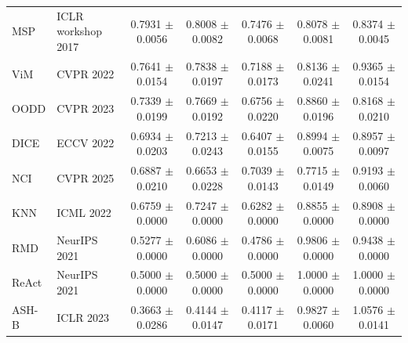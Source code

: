 \begin{table}[!htbp]
{\begin{tabular}{llccccc}
MSP & ICLR workshop 2017 & 0.7931 $\pm$ 0.0056 & 0.8008 $\pm$ 0.0082 & 0.7476 $\pm$ 0.0068 & 0.8078 $\pm$ 0.0081 & 0.8374 $\pm$ 0.0045 \\
ViM & CVPR 2022 & 0.7641 $\pm$ 0.0154 & 0.7838 $\pm$ 0.0197 & 0.7188 $\pm$ 0.0173 & 0.8136 $\pm$ 0.0241 & 0.9365 $\pm$ 0.0154 \\
OODD & CVPR 2023 & 0.7339 $\pm$ 0.0199 & 0.7669 $\pm$ 0.0192 & 0.6756 $\pm$ 0.0220 & 0.8860 $\pm$ 0.0196 & 0.8168 $\pm$ 0.0210 \\
DICE & ECCV 2022 & 0.6934 $\pm$ 0.0203 & 0.7213 $\pm$ 0.0243 & 0.6407 $\pm$ 0.0155 & 0.8994 $\pm$ 0.0075 & 0.8957 $\pm$ 0.0097 \\
NCI & CVPR 2025 & 0.6887 $\pm$ 0.0210 & 0.6653 $\pm$ 0.0228 & 0.7039 $\pm$ 0.0143 & 0.7715 $\pm$ 0.0149 & 0.9193 $\pm$ 0.0060 \\
KNN & ICML 2022 & 0.6759 $\pm$ 0.0000 & 0.7247 $\pm$ 0.0000 & 0.6282 $\pm$ 0.0000 & 0.8855 $\pm$ 0.0000 & 0.8908 $\pm$ 0.0000 \\
RMD & NeurIPS 2021 & 0.5277 $\pm$ 0.0000 & 0.6086 $\pm$ 0.0000 & 0.4786 $\pm$ 0.0000 & 0.9806 $\pm$ 0.0000 & 0.9438 $\pm$ 0.0000 \\
ReAct & NeurIPS 2021 & 0.5000 $\pm$ 0.0000 & 0.5000 $\pm$ 0.0000 & 0.5000 $\pm$ 0.0000 & 1.0000 $\pm$ 0.0000 & 1.0000 $\pm$ 0.0000 \\
ASH-B & ICLR 2023 & 0.3663 $\pm$ 0.0286 & 0.4144 $\pm$ 0.0147 & 0.4117 $\pm$ 0.0171 & 0.9827 $\pm$ 0.0060 & 1.0576 $\pm$ 0.0141 \\
\bottomrule
\end{tabular}%
}
\end{table}

\clearpage


